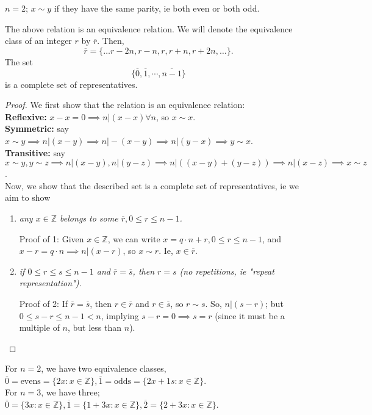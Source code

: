 \documentclass[12pt,oneside]{article}
\begin{document}
\begin{example}
$n = 2$; $x \sim y$ if they have the same parity, ie both even or both odd.  
\end{example}

\begin{lemma}
  The above relation is an equivalence relation. We will denote the equivalence class of an integer $r$ by $\overline{r}$. Then, \[\overline{r} = \{\dots r - 2n, r - n, r , r+n, r + 2n, \dots\}.\]
  The set \[
  \{\overline{0}, \overline{1}, \cdots, \overline{n-1}\}  
  \]
is a complete set of representatives.
\end{lemma}

\begin{proof} We first show that the relation is an equivalence relation:\\
  \textbf{Reflexive: } $x - x = 0 \implies n | (x-x) \forall n$, so $x \sim x$.\\
  \textbf{Symmetric: } say $x \sim y \implies n | (x-y) \implies n | -(x-y) \implies n | (y - x) \implies y \sim x$.\\
  \textbf{Transitive: } say $x \sim y, y \sim z \implies n | (x-y), n |(y-z) \implies n | ((x-y) + (y-z)) \implies n | (x-z) \implies x \sim z$.\\
  Now, we show that the described set is a complete set of representatives, ie we aim to show \begin{enumerate}
    \item \textit{any $x \in \mathbb{Z}$ belongs to some $\overline{r}, 0 \leq r \leq n-1$.}


    Proof of 1: Given $x \in \mathbb{Z}$, we can write $x = q \cdot n + r, 0 \leq r \leq n - 1$, and $x - r = q \cdot n\implies n | (x-r)$, so $x \sim r$. Ie, $x \in \overline{r}$.
    \item \textit{if $0 \leq r \leq s \leq n - 1$ and $\overline{r} = \overline{s}$, then $r = s$ (no repetitions, ie "repeat representation").}
    

   Proof of 2: If $\overline{r} = \overline{s}$, then $r \in \overline{r}$ and $r \in \overline{s}$, so $r \sim s$. So, $n | (s-r)$; but $0 \leq s - r \leq n - 1 < n$, implying $s-r = 0 \implies s = r$ (since it must be a multiple of $n$, but less than $n$).
  \end{enumerate}
\end{proof}

\begin{example}
  For $n = 2$, we have two equivalence classes, $\overline{0} =\text{evens} = \{2x : x \in \mathbb{Z}\}, \overline{1} = \text{odds} = \{2x + 1s: x \in \mathbb{Z}\}$.\\
  For $n = 3$, we have three; $\overline{0} = \{3x : x \in \mathbb{Z}\}, \overline{1} = \{1 + 3x : x \in \mathbb{Z}\}, \overline{2} = \{2 + 3x : x \in \mathbb{Z}\}$.
\end{example}
\end{document}
